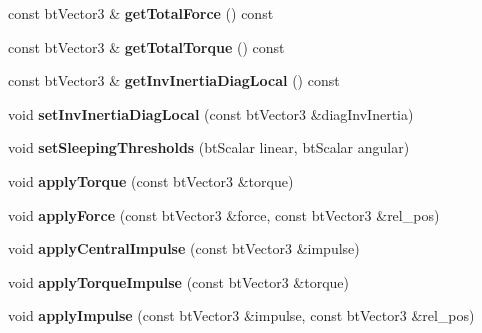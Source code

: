 \begin{DoxyCompactItemize}
\mbox{\label{classbtRigidBody_aaeba73314c3a932d2a3f7b198eabf97c}} 
const bt\+Vector3 \& {\bfseries get\+Total\+Force} () const
\item 
\mbox{\label{classbtRigidBody_a6587c6d8add7e07c5cbb620303cecb5e}} 
const bt\+Vector3 \& {\bfseries get\+Total\+Torque} () const
\item 
\mbox{\label{classbtRigidBody_ae9099e39ca4e591acf1d28ec95a038b9}} 
const bt\+Vector3 \& {\bfseries get\+Inv\+Inertia\+Diag\+Local} () const
\item 
\mbox{\label{classbtRigidBody_ac47e4f27b351e24ed180bb0fcfa5a51d}} 
void {\bfseries set\+Inv\+Inertia\+Diag\+Local} (const bt\+Vector3 \&diag\+Inv\+Inertia)
\item 
\mbox{\label{classbtRigidBody_a8ed442345551ea2d4e4b30ec19597b69}} 
void {\bfseries set\+Sleeping\+Thresholds} (bt\+Scalar linear, bt\+Scalar angular)
\item 
\mbox{\label{classbtRigidBody_aede3cf53474f4b367693b19871692b99}} 
void {\bfseries apply\+Torque} (const bt\+Vector3 \&torque)
\item 
\mbox{\label{classbtRigidBody_af016720c45cf7ccaf8701d81a28319d9}} 
void {\bfseries apply\+Force} (const bt\+Vector3 \&force, const bt\+Vector3 \&rel\+\_\+pos)
\item 
\mbox{\label{classbtRigidBody_a82f6590ea4fa13c359ae8809a5112ee7}} 
void {\bfseries apply\+Central\+Impulse} (const bt\+Vector3 \&impulse)
\item 
\mbox{\label{classbtRigidBody_a0084ebc850f06cd043d70ee87e6a3457}} 
void {\bfseries apply\+Torque\+Impulse} (const bt\+Vector3 \&torque)
\item 
\mbox{\label{classbtRigidBody_a8274f89d9e6b8fe945282797bd25f377}} 
void {\bfseries apply\+Impulse} (const bt\+Vector3 \&impulse, const bt\+Vector3 \&rel\+\_\+pos)
\item 
\mbox{\label{classbtRigidBody_a1ffe77aaa4d3712457aa8f9aa83f42a7}} 

\end{DoxyCompactItemize}
